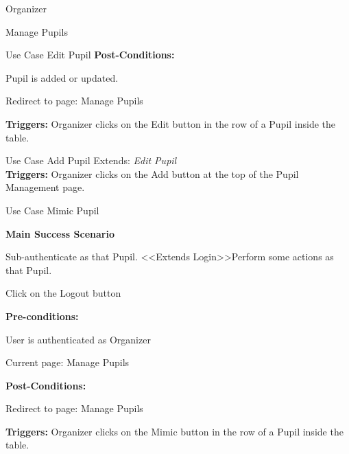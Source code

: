\documentclass[10pt,a4paper]{article}
\newenvironment{enumerate*}%
  {\begin{enumerate}[topsep=0pt]
    \setlength{\itemsep}{0pt}%
    \setlength{\parskip}{0pt}%
  }{\end{enumerate}}
\begin{document}
\begin{section}{Organizer}
\begin{subsection}{Manage Pupils}
\begin{subsubsection}{Use Case Edit Pupil}
\textbf{Post-Conditions:}
\begin{enumerate*}
\item Pupil is added or updated.
\item Redirect to page: Manage Pupils
\end{enumerate*}

\textbf{Triggers:} Organizer clicks on the Edit button in the row of a Pupil inside the
table.

\end{subsubsection}

\begin{subsubsection}{Use Case Add Pupil}
Extends: \emph{Edit Pupil}\\

\vspace{8 pt}
\textbf{Triggers:} Organizer clicks on the Add button at the top of the Pupil Management
page.
\end{subsubsection}

\begin{subsubsection}{Use Case Mimic Pupil}
\vspace{8 pt}

\textbf{Main Success Scenario}
\begin{enumerate*}
\item Sub-authenticate as that Pupil. \textless\textless Extends Login\textgreater\textgreater Perform some actions as that
Pupil.
\item Click on the Logout button
\end{enumerate*}

\vspace{4 pt}

\textbf{Pre-conditions:}
\begin{enumerate*}
\item User is authenticated as Organizer
\item Current page: Manage Pupils
\end{enumerate*}

\textbf{Post-Conditions:}
\begin{enumerate*}
\item Redirect to page: Manage Pupils
\end{enumerate*}

\textbf{Triggers:} Organizer clicks on the Mimic button in the row of a Pupil inside the
table.

\end{subsubsection}

\end{subsection}
\end{section}
\end{document}
